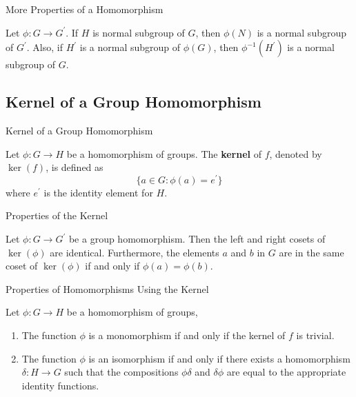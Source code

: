\documentclass{beamer}
\begin{document}
\begin{frame}{More Properties of a Homomorphism}
\begin{theorem}
Let $\phi: G \rightarrow G^{\prime}$. If $H$ is normal subgroup of $G$, then $\phi(N)$ is a normal subgroup of $G^{\prime}$. Also, if $H^{\prime}$ is a normal subgroup of $\phi(G)$, then $\phi^{-1}(H^{\prime})$ is a normal subgroup of $G$.
\end{theorem}    
\end{frame}

\subsection{Kernel of a Group Homomorphism}

\begin{frame}{Kernel of a Group Homomorphism}
\begin{definition}
\justifying
Let $\phi: G \rightarrow H$ be a homomorphism of groups. The \textbf{kernel} of $f$, denoted by $\ker(f)$, is defined as 
\[
\{a \in G: \phi(a) = e^{\prime}\}
\]
where $e^{\prime}$ is the identity element for $H$.
\end{definition}    
\end{frame}

\begin{frame}{Properties of the Kernel}
\begin{theorem}
Let $\phi: G \rightarrow G^{\prime}$ be a group homomorphism. Then the left and right cosets of $\ker(\phi)$ are identical. Furthermore, the elements $a$ and $b$ in $G$ are in the same coset of $\ker(\phi)$ if and only if $\phi(a) = \phi(b)$.
\end{theorem}    
\end{frame}

\begin{frame}{Properties of Homomorphisms Using the Kernel}
\begin{theorem}
\justifying
Let $\phi: G \rightarrow H$ be a homomorphism of groups, 
\begin{enumerate}
\justifying
\item The function $\phi$ is a monomorphism if and only if the kernel of $f$ is trivial.
\item The function $\phi$ is an isomorphism if and only if there exists a homomorphism $\delta: H \rightarrow G$ such that the compositions $\phi\delta$ and $\delta\phi$ are equal to the appropriate identity functions.
\end{enumerate}
\end{theorem}    
\end{frame}
\end{document}

